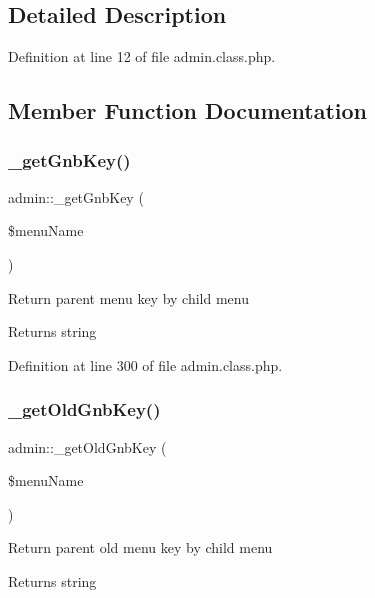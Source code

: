 \subsection{Detailed Description}


Definition at line 12 of file admin.\+class.\+php.



\subsection{Member Function Documentation}
\hypertarget{classadmin_a7297fe26173604ac1cd8f736474873a4}{}\label{classadmin_a7297fe26173604ac1cd8f736474873a4} 
\subsubsection{\texorpdfstring{\+\_\+get\+Gnb\+Key()}{\_getGnbKey()}}
{\footnotesize\ttfamily admin\+::\+\_\+get\+Gnb\+Key (\begin{DoxyParamCaption}\item[{}]{\$menu\+Name }\end{DoxyParamCaption})}

Return parent menu key by child menu \begin{DoxyReturn}{Returns}
string 
\end{DoxyReturn}


Definition at line 300 of file admin.\+class.\+php.

\hypertarget{classadmin_ad7c619fa724464fdebf9523c2654ff3b}{}\label{classadmin_ad7c619fa724464fdebf9523c2654ff3b} 
\subsubsection{\texorpdfstring{\+\_\+get\+Old\+Gnb\+Key()}{\_getOldGnbKey()}}
{\footnotesize\ttfamily admin\+::\+\_\+get\+Old\+Gnb\+Key (\begin{DoxyParamCaption}\item[{}]{\$menu\+Name }\end{DoxyParamCaption})}

Return parent old menu key by child menu \begin{DoxyReturn}{Returns}
string 
\end{DoxyReturn}


